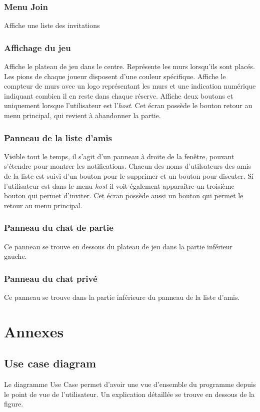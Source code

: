 \documentclass[a4paper,10pt]{article}
\newcommand{\button}[1]{
    \fbox{\textsc{#1}}}
\begin{document}
\subsubsection{Menu Join}
Affiche une liste des invitations

\subsubsection{Affichage du jeu}
Affiche le plateau de jeu dans le centre.
Représente les murs lorsqu'ils sont placés.
Les pions de chaque joueur disposent d'une couleur spécifique.
Affiche le compteur de murs avec un logo représentant les murs et une indication numérique indiquant combien il en reste dans chaque réserve. Affiche deux boutons \button{pause} et\button{save} uniquement lorsque l'utilisateur est l'\textit{host}. Cet écran possède le bouton retour au menu principal, qui revient à abandonner la partie.

\subsubsection{Panneau de la liste d'amis}
Visible tout le temps, il s'agit d'un panneau à droite de la fenêtre, pouvant s'étendre pour montrer les notifications.
Chacun des noms d'utilsateurs des amis de la liste est suivi d'un bouton pour le supprimer et un bouton pour discuter. Si l'utilisateur est dans le menu \textit{host} il voit également apparaître un troisième bouton qui permet d'inviter. Cet écran possède aussi un bouton qui permet le retour au menu principal.
\subsubsection{Panneau du chat de partie}
Ce panneau se trouve en dessous du plateau de jeu dans la partie inférieur gauche.
\subsubsection{Panneau du chat privé}
Ce panneau se trouve dans la partie inférieure du panneau de la liste d'amis.

\section{Annexes}
\subsection{Use case diagram}
Le diagramme Use Case permet d'avoir une vue d'ensemble du programme depuis le point de vue de l'utilisateur. Un explication détaillée se trouve en dessous de la figure.
\end{document}
